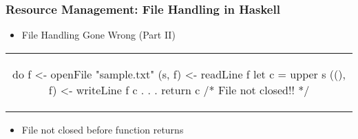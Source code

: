 \documentclass[xcolor={dvipsnames}, frame]{beamer}
\begin{document}
\begin{frame}[fragile]
  \frametitle{Resource Management: File Handling in Haskell}
  \begin{center}

  \begin{itemize}
  \item File Handling Gone Wrong (Part II)
  \end{itemize}
  \begin{tabular}[h]{c}
    \begin{haskell}
    do f  <- openFile "sample.txt"
       (s, f)  <- readLine f
       let c = upper s
       ((), f) <- writeLine f c
           .
           .
           .
       return c /* File not closed!! */
     \end{haskell}
  \end{tabular}
  \begin{itemize}
  \item File not closed before function returns
  \end{itemize}
  \end{center}
\end{frame}



\end{document}
